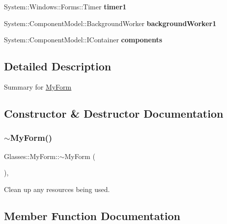 \begin{DoxyCompactItemize}
\item 
\mbox{\label{class_glasses_1_1_my_form_a6903a0c44826e7b13073fcd32b91e3a1}} 
System\+::\+Windows\+::\+Forms\+::\+Timer {\bfseries timer1}
\item 
\mbox{\label{class_glasses_1_1_my_form_a3b2d5577feaa250572aeff7c104c3efd}} 
System\+::\+Component\+Model\+::\+Background\+Worker {\bfseries background\+Worker1}
\item 
\mbox{\label{class_glasses_1_1_my_form_a0a50b42ee3b95b370e36d714a72a58e0}} 
System\+::\+Component\+Model\+::\+I\+Container {\bfseries components}
\end{DoxyCompactItemize}


\subsection{Detailed Description}
Summary for \hyperlink{class_glasses_1_1_my_form}{My\+Form} 



\subsection{Constructor \& Destructor Documentation}
\mbox{\label{class_glasses_1_1_my_form_ab244dc3aa12a1531b1092f6fc1ad45c3}} 
\subsubsection{\texorpdfstring{$\sim$\+My\+Form()}{~MyForm()}}
{\footnotesize\ttfamily Glasses\+::\+My\+Form\+::$\sim$\+My\+Form (\begin{DoxyParamCaption}{ }\end{DoxyParamCaption})\hspace{0.3cm}{\ttfamily [inline]}, {\ttfamily [protected]}}



Clean up any resources being used. 



\subsection{Member Function Documentation}
\mbox{\label{class_glasses_1_1_my_form_a53ab94a74403574619ba9f0a116f5c5b}} 
